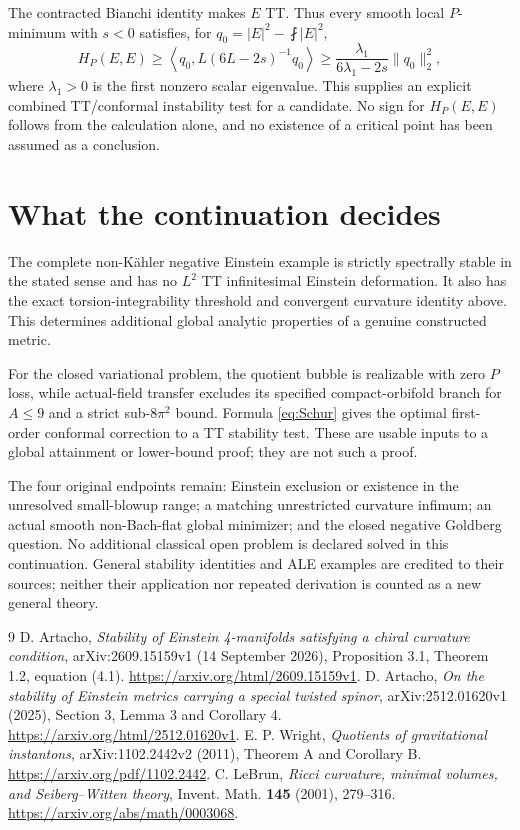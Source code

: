 \documentclass[11pt]{article}
\newcommand{\ip}[2]{\left\langle #1,#2\right\rangle}
\begin{document}
The contracted Bianchi identity makes $E$ TT. Thus every smooth local $P$-minimum with $s<0$ satisfies, for $q_0=|E|^2-\fint|E|^2$,
\begin{equation}\label{eq:variance}
 H_P(E,E)\ge\ip{q_0}{L(6L-2s)^{-1}q_0}
 \ge\frac{\lambda_1}{6\lambda_1-2s}\|q_0\|_2^2,
\end{equation}
where $\lambda_1>0$ is the first nonzero scalar eigenvalue. This supplies an explicit combined TT/conformal instability test for a candidate. No sign for $H_P(E,E)$ follows from the calculation alone, and no existence of a critical point has been assumed as a conclusion.

\section{What the continuation decides}
The complete non-K\"ahler negative Einstein example is strictly spectrally stable in the stated sense and has no $L^2$ TT infinitesimal Einstein deformation. It also has the exact torsion-integrability threshold and convergent curvature identity above. This determines additional global analytic properties of a genuine constructed metric.

For the closed variational problem, the quotient bubble is realizable with zero $P$ loss, while actual-field transfer excludes its specified compact-orbifold branch for $A\le9$ and a strict sub-$8\pi^2$ bound. Formula \eqref{eq:Schur} gives the optimal first-order conformal correction to a TT stability test. These are usable inputs to a global attainment or lower-bound proof; they are not such a proof.

The four original endpoints remain: Einstein exclusion or existence in the unresolved small-blowup range; a matching unrestricted curvature infimum; an actual smooth non-Bach-flat global minimizer; and the closed negative Goldberg question. No additional classical open problem is declared solved in this continuation. General stability identities and ALE examples are credited to their sources; neither their application nor repeated derivation is counted as a new general theory.

\begin{thebibliography}{9}
 D. Artacho, \emph{Stability of Einstein 4-manifolds satisfying a chiral curvature condition}, arXiv:2609.15159v1 (14 September 2026), Proposition 3.1, Theorem 1.2, equation (4.1). \url{https://arxiv.org/html/2609.15159v1}.
 D. Artacho, \emph{On the stability of Einstein metrics carrying a special twisted spinor}, arXiv:2512.01620v1 (2025), Section 3, Lemma 3 and Corollary 4. \url{https://arxiv.org/html/2512.01620v1}.
 E. P. Wright, \emph{Quotients of gravitational instantons}, arXiv:1102.2442v2 (2011), Theorem A and Corollary B. \url{https://arxiv.org/pdf/1102.2442}.
 C. LeBrun, \emph{Ricci curvature, minimal volumes, and Seiberg--Witten theory}, Invent. Math. \textbf{145} (2001), 279--316. \url{https://arxiv.org/abs/math/0003068}.
\end{thebibliography}
\end{document}
